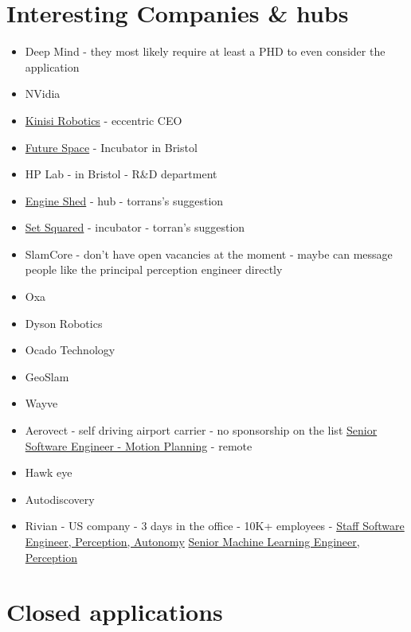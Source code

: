 \section*{Interesting Companies \& hubs}
\begin{itemize}
\item
    Deep Mind - they most likely require at least a PHD to even consider the
    application
\item
    NVidia
\item
    \href{https://kinisi.com/}{Kinisi Robotics} - eccentric CEO
\item
    \href{https://www.futurespacebristol.co.uk/}{Future Space} - Incubator in Bristol
\item
    HP Lab - in Bristol - R\&D department
\item
    \href{https://engine-shed.co.uk/}{Engine Shed} - hub - torrans's suggestion
\item
    \href{https://setsquared-bristol.co.uk/}{Set Squared} - incubator - torran's suggestion
\item SlamCore - don't have open vacancies at the moment - maybe can message people like the principal perception engineer directly
\item Oxa
\item Dyson Robotics
\item Ocado Technology
\item GeoSlam
\item Wayve
\item Aerovect - self driving airport carrier - no sponsorship on the list
    \href{https://jobs.ashbyhq.com/aerovect/d8b9d003-fcf9-4568-bc81-d1d2cb617cee}
    {Senior Software Engineer - Motion Planning} - remote
\item Hawk eye
\item Autodiscovery
\item Rivian - US company - 3 days in the office - 10K+ employees -
    \href{https://careers.rivian.com/careers-home/jobs/24822?lang=en-us&previousLocale=en-US}
    {Staff Software Engineer, Perception, Autonomy}
    \href{https://careers.rivian.com/careers-home/jobs/24823?lang=en-us&previousLocale=en-US}{Senior
    Machine Learning Engineer, Perception}

\end{itemize}


\section*{Closed applications}

